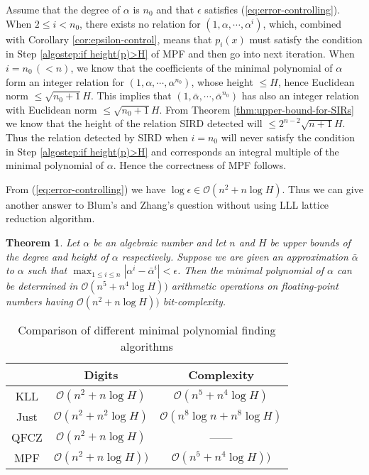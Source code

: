 \documentclass{sig-alternate}
\newtheorem{thm}[theorem]{Theorem}
\numberwithin{theorem}{section} \numberwithin{equation}{section}
\begin{document}
Assume that the degree of $\alpha$ is $n_0$ and that $\epsilon$
satisfies (\ref{eq:error-controlling}). When $2\leq i<n_0$, there
exists no relation for $(1,\alpha,\cdots,\alpha^i)$, which, combined
with Corollary \ref{cor:epsilon-control}, means that $p_i(x)$ must
satisfy the condition in Step \ref{algostep:if height(p)>H} of MPF
and then go into next iteration. When $i=n_0\,(<n)$, we know that
the coefficients of the minimal polynomial of $\alpha$ form an
integer relation for $(1,\alpha,\cdots,\alpha^{n_0})$, whose height
$\leq H$, hence Euclidean norm $\leq\sqrt{n_0+1}H$. This implies
that $(1,\bar{\alpha}, \cdots,\bar{\alpha}^{n_0})$ has also an
integer relation with Euclidean norm $\leq\sqrt{n_0+1}H$. From
Theorem \ref{thm:upper-bound-for-SIRs} we know that the height of
the relation SIRD detected will $\leq 2^{n-2}\sqrt{n+1}H$. Thus the
relation detected by SIRD when $i=n_0$ will never satisfy the
condition in Step \ref{algostep:if height(p)>H}  and corresponds an
integral multiple of the minimal polynomial of $\alpha$. Hence the
correctness of MPF follows.

From  (\ref{eq:error-controlling}) we have $\log \epsilon
 \in \mathcal{O}(n^2 + n\log H)$. Thus we can give
another answer to  Blum's and Zhang's question without using LLL
lattice reduction algorithm.

\begin{thm}\label{thm:complexity-of-finding-algorithm-fpa}
Let $\alpha$ be an algebraic number and let $n$ and $H$ be upper
bounds of the degree and height of $\alpha$ respectively. Suppose we
are given an approximation $\bar{\alpha}$ to $\alpha$ such that
$\max_{1\leq i\leq n}|\alpha^{i}-\bar{\alpha}^{i}| < \epsilon$. Then
the minimal polynomial of $\alpha$ can be determined in $\mathcal
{O}(n^5 + n^4\log H))$ arithmetic operations on floating-point
numbers having $\mathcal{O}(n^2 + n\log H))$ bit-complexity.
\end{thm}


\begin{table}[H]
\begin{tabular}{||c|c|c|}
  \hline
& Digits & Complexity \\\hline
  KLL\cite{KLL1988} & $\mathcal{O}(n^2+n\log H)$ & $\mathcal
{O}(n^5 + n^4\log H)$ \\\hline
  Just\cite{Jus1989} & $\mathcal
{O}(n^2 + n^2\log H)$ & $\mathcal {O}(n^8\log n + n^8\log H)$
\\\hline
  QFCZ\cite{QFC2009} & $\mathcal{O}(n^2 + n\log H)$ & ------ \\\hline
  MPF & $\mathcal{O}(n^2 + n\log H))$ & $\mathcal
{O}(n^5 + n^4\log H))$ \\
  \hline
\end{tabular}\caption{Comparison of different minimal polynomial finding
algorithms}\label{tab:comparison of MPFs}
\end{table}
\end{document}
